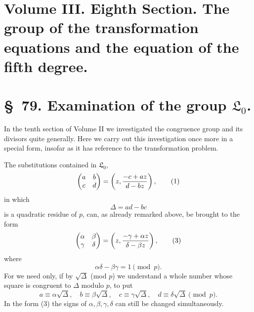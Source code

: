 \documentclass[11pt]{article}
\newcommand{\Lzero}{\mathfrak L_0}
\begin{document}
\clearpage
\section*{Volume III. Eighth Section. The group of the transformation equations and the equation of the fifth degree.}

\section*{\S~79. Examination of the group $\Lzero$.}

In the tenth section of Volume II we investigated the congruence group and its divisors quite generally. Here we carry out this investigation once more in a special form, insofar as it has reference to the transformation problem.

The substitutions contained in $\Lzero$,
\begin{equation}
 \begin{pmatrix}a&b\\ c&d\end{pmatrix}
 =\left(z,{ -c+az\over d-bz}\right),
\tag{1}
\end{equation}
in which
\begin{equation}
 \Delta=ad-bc
\tag{2}
\end{equation}
is a quadratic residue of $p$, can, as already remarked above, be brought to the form
\begin{equation}
 \begin{pmatrix}\alpha&\beta\\ \gamma&\delta\end{pmatrix}
 =\left(z,{ -\gamma+\alpha z\over \delta-\beta z}\right),
\tag{3}
\end{equation}
where
\begin{equation}
 \alpha\delta-\beta\gamma=1\pmod p.
\tag{4}
\end{equation}
For we need only, if by $\sqrt\Delta$ (mod $p$) we understand a whole number whose square is congruent to $\Delta$ modulo $p$, to put
\[
 a\equiv \alpha\sqrt\Delta,
 \quad b\equiv\beta\sqrt\Delta,
 \quad c\equiv\gamma\sqrt\Delta,
 \quad d\equiv\delta\sqrt\Delta\pmod p.
\]
In the form (3) the signs of $\alpha,\beta,\gamma,\delta$ can still be changed simultaneously.
\end{document}
